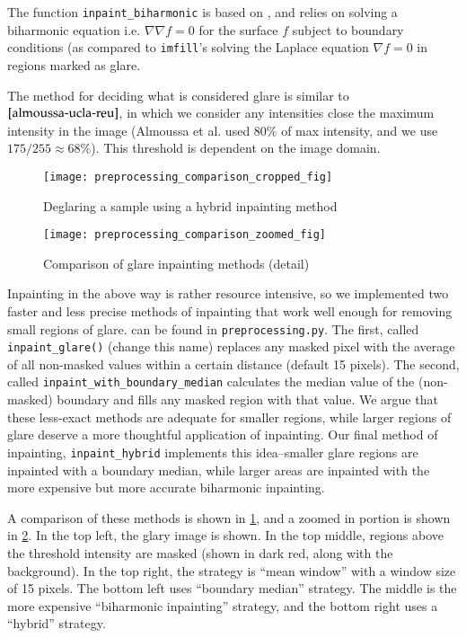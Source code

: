     The function \texttt{inpaint\_biharmonic} is based on \cite{damelin2018surface}, and relies on solving a
    biharmonic equation i.e. $\nabla \nabla f = 0$ for the surface $f$ subject to boundary conditions (as
    compared to \texttt{imfill}'s solving the Laplace equation $\nabla f = 0$ in regions marked as glare.
    
    The method for deciding what is considered glare is similar to $\cite{almoussa-ucla-reu}$, in which we
    consider any intensities close the maximum intensity in the image (Almoussa et al. used $80\%$ of max intensity, and we use $175/255 \approx 68\%$). This threshold is dependent on the image domain.
    
        \begin{figure} 
        \texttt{[image: preprocessing\_comparison\_cropped\_fig]}
        \caption{Deglaring a sample using a hybrid inpainting method}
        \label{fig:glare-example-crop}
        \end{figure}

        \begin{figure} 
        \texttt{[image: preprocessing\_comparison\_zoomed\_fig]}
        \caption{Comparison of glare inpainting methods (detail)}
        \label{fig:glare-example-zoom}
        \end{figure}
    
    Inpainting in the above way is rather resource intensive, so we implemented two faster and less precise methods of inpainting that work well enough for removing small regions of glare.  can be found in \texttt{preprocessing.py}. The first, called 
    \texttt{inpaint\_glare()} (change this name) replaces any masked pixel with the average of all non-masked values within a certain distance (default 15 pixels). The second, called \texttt{inpaint\_with\_boundary\_median} calculates the median value of the  (non-masked) boundary and fills any masked region with that value. We argue that these less-exact methods are adequate for smaller regions, while larger regions of glare deserve a more thoughtful application of inpainting. Our final method of inpainting, \texttt{inpaint\_hybrid} implements this idea--smaller glare regions are inpainted with a boundary median, while larger areas are inpainted with the more expensive but more accurate biharmonic inpainting.
    
    A comparison of these methods is shown in \cref{fig:glare-example-crop},
    and a zoomed in portion is shown in \cref{fig:glare-example-zoom}. In the top left, the glary image is shown.  In the top middle,
    regions above the threshold intensity are masked (shown in dark red, along with the background). In the top right, the strategy is ``mean window'' with a window size of 15 pixels. The bottom left uses ``boundary median'' strategy. The middle is the more expensive ``biharmonic inpainting'' strategy, and the bottom right uses a ``hybrid'' strategy.
    
